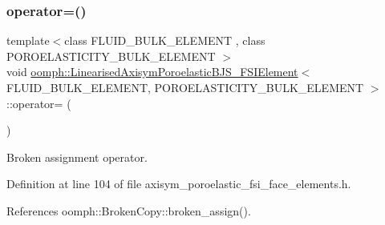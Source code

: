 \subsubsection{\texorpdfstring{operator=()}{operator=()}}
{\footnotesize\ttfamily template$<$class F\+L\+U\+I\+D\+\_\+\+B\+U\+L\+K\+\_\+\+E\+L\+E\+M\+E\+NT , class P\+O\+R\+O\+E\+L\+A\+S\+T\+I\+C\+I\+T\+Y\+\_\+\+B\+U\+L\+K\+\_\+\+E\+L\+E\+M\+E\+NT $>$ \\
void \hyperlink{classoomph_1_1LinearisedAxisymPoroelasticBJS__FSIElement}{oomph\+::\+Linearised\+Axisym\+Poroelastic\+B\+J\+S\+\_\+\+F\+S\+I\+Element}$<$ F\+L\+U\+I\+D\+\_\+\+B\+U\+L\+K\+\_\+\+E\+L\+E\+M\+E\+NT, P\+O\+R\+O\+E\+L\+A\+S\+T\+I\+C\+I\+T\+Y\+\_\+\+B\+U\+L\+K\+\_\+\+E\+L\+E\+M\+E\+NT $>$\+::operator= (\begin{DoxyParamCaption}\item[{const \hyperlink{classoomph_1_1LinearisedAxisymPoroelasticBJS__FSIElement}{Linearised\+Axisym\+Poroelastic\+B\+J\+S\+\_\+\+F\+S\+I\+Element}$<$ F\+L\+U\+I\+D\+\_\+\+B\+U\+L\+K\+\_\+\+E\+L\+E\+M\+E\+NT, P\+O\+R\+O\+E\+L\+A\+S\+T\+I\+C\+I\+T\+Y\+\_\+\+B\+U\+L\+K\+\_\+\+E\+L\+E\+M\+E\+NT $>$ \&}]{ }\end{DoxyParamCaption})\hspace{0.3cm}{\ttfamily [inline]}}



Broken assignment operator. 



Definition at line 104 of file axisym\+\_\+poroelastic\+\_\+fsi\+\_\+face\+\_\+elements.\+h.



References oomph\+::\+Broken\+Copy\+::broken\+\_\+assign().

\mbox{\label{classoomph_1_1LinearisedAxisymPoroelasticBJS__FSIElement_a995babfb257bffea27ce2c3476b9e642}} 
